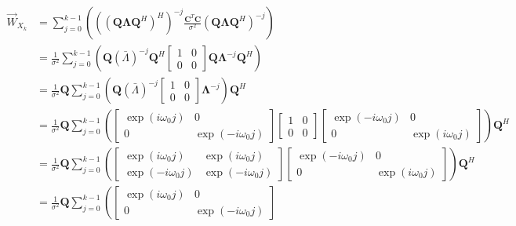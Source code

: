 \documentclass[11pt,a4paper,twoside]{report}
\newcommand{\messF}[3]{\vec{#1}_{{#2}_{k{#3}}}}
\newcommand{\mat}[1]{\mathbf{#1}}
\begin{document}
\begin{align}
	\nonumber
	\messF{W}{X}{} &= \sum_{j=0}^{k-1}\left(\left(\left(\mat{Q\Lambda}\mat{Q}^H\right)^H\right)^{-j}\frac{\mat{C}^T\mat{C}}{\sigma^2}\left(\mat{Q\Lambda}\mat{Q}^H\right)^{-j}\right) \\
	\label{eq: update rule, unitary Q}
	&= \frac{1}{\sigma^2}\sum_{j=0}^{k-1}\left(\mat{Q}\left(\bar{\Lambda}\right)^{-j}\mat{Q}^H
		\begin{bmatrix}
			1 & 0 \\
			0 & 0
		\end{bmatrix}
		\mat{Q}\mat{\Lambda}^{-j}\mat{Q}^H\right)
	\\
	\nonumber
	&= \frac{1}{\sigma^2}\mat{Q}\sum_{j=0}^{k-1}\left(\mat{Q}\left(\bar{\Lambda}\right)^{-j}
		\begin{bmatrix}
			1 & 0 \\
			0 & 0
		\end{bmatrix}
		\mat{\Lambda}^{-j}\right)\mat{Q}^H
	\\
	\nonumber
	&= \frac{1}{\sigma^2}\mat{Q}\sum_{j=0}^{k-1}\left(
		\begin{bmatrix}
			\exp{(i\omega_0j)} & 0 \\
			0 & \exp{(-i\omega_0j)}
		\end{bmatrix}
		\begin{bmatrix}
			1 & 0 \\
			0 & 0
		\end{bmatrix}
		\begin{bmatrix}
			\exp{(-i\omega_0j)} & 0 \\
			0 & \exp{(i\omega_0j)}
		\end{bmatrix}
		\right)\mat{Q}^H
	\\
	\nonumber
	&= \frac{1}{\sigma^2}\mat{Q}\sum_{j=0}^{k-1}\left(
		\begin{bmatrix}
			\exp{(i\omega_0j)} & \exp{(i\omega_0j)} \\
			\exp{(-i\omega_0j)} & \exp{(-i\omega_0j)}
		\end{bmatrix}
		\begin{bmatrix}
			\exp{(-i\omega_0j)} & 0 \\
			0 & \exp{(i\omega_0j)}
		\end{bmatrix}
		\right)\mat{Q}^H
	\\
	\nonumber
	&= \frac{1}{\sigma^2}\mat{Q}\sum_{j=0}^{k-1}\left(
		\begin{bmatrix}
			\exp{(i\omega_0j)} & 0 \\
			0 & \exp{(-i\omega_0j)}
		\end{bmatrix}

\end{align}
\end{document}

